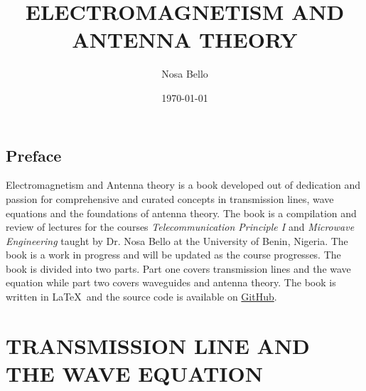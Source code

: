 \documentclass[a4paper,10pt, two column]{book}
\begin{document}
\author{Nosa Bello}
\title{ELECTROMAGNETISM AND ANTENNA THEORY}
\date{\today}

\frontmatter
\maketitle
\tableofcontents

\chapter{Preface}
Electromagnetism and Antenna theory is a book developed out of dedication and passion for comprehensive and curated concepts in transmission lines, wave equations and the foundations of antenna theory. The book is a compilation and review of lectures for the courses \textit{Telecommunication Principle I} and \textit{Microwave Engineering} taught by Dr. Nosa Bello at the University of Benin, Nigeria. The book is a work in progress and will be updated as the course progresses. The book is divided into two parts. Part one covers transmission lines and the wave equation while part two covers waveguides and antenna theory. The book is written in \LaTeX\ and the source code is available on \href{https://github.com/allisonoge/electromagnetism-and-antenna-theory-v2.git}{GitHub}.

\mainmatter

\part{TRANSMISSION LINE AND THE WAVE EQUATION}















% 
% 
% 
% 
% 
% 
% 
% 
% 
% 
% 
% 
% 
% 
% 
% 
% 
% 
% 
\end{document}
